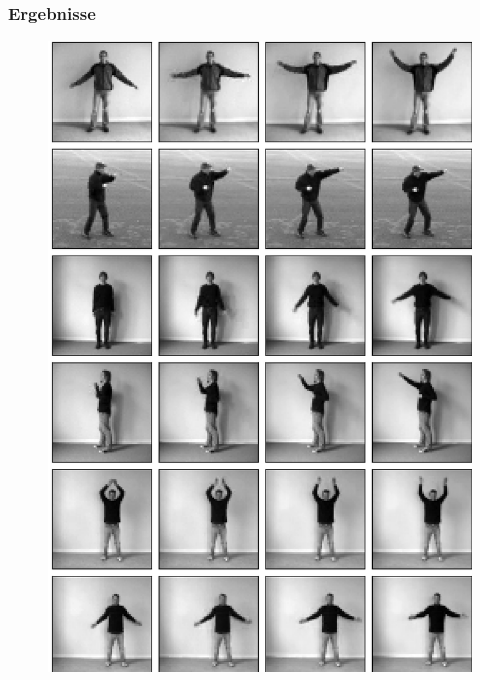 \begin{frame}
\frametitle{Ergebnisse}
\begin{figure}[h!]
	\begin{minipage}[position=l]{0.5\textwidth}
			\includegraphics[scale=0.3]{Bilder/movies_input}
	\end{minipage}
	\begin{minipage}[position=r]{0.4\textwidth}

\end{minipage}
\end{figure}
\end{frame}
